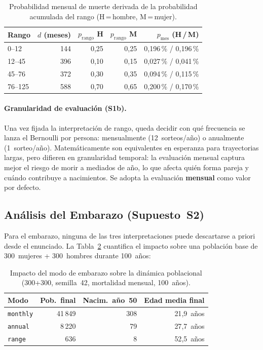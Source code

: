 \documentclass{llncs}
\begin{document}
\begin{table}[H]
\caption{Probabilidad mensual de muerte derivada de la probabilidad
         acumulada del rango (H\,=\,hombre, M\,=\,mujer).}
\label{tab:death_monthly}
\centering
\begin{tabular}{lrrrr}
\toprule
\textbf{Rango} & \textbf{$d$ (meses)} &
\textbf{$p_{\text{rango}}$ H} &
\textbf{$p_{\text{rango}}$ M} &
\textbf{$p_{\text{mes}}$ (H\,/\,M)} \\
\midrule
0--12   & 144 & 0{,}25 & 0{,}25 & 0{,}196\,\% / 0{,}196\,\% \\
12--45  & 396 & 0{,}10 & 0{,}15 & 0{,}027\,\% / 0{,}041\,\% \\
45--76  & 372 & 0{,}30 & 0{,}35 & 0{,}094\,\% / 0{,}115\,\% \\
76--125 & 588 & 0{,}70 & 0{,}65 & 0{,}200\,\% / 0{,}170\,\% \\
\bottomrule
\end{tabular}
\end{table}

\paragraph{Granularidad de evaluación (S1b).}
Una vez fijada la interpretación de rango, queda decidir con qué frecuencia
se lanza el Bernoulli por persona: mensualmente (12~sorteos/año) o
anualmente (1~sorteo/año).
Matemáticamente son equivalentes en esperanza para trayectorias largas,
pero difieren en granularidad temporal: la evaluación mensual captura mejor
el riesgo de morir a mediados de año, lo que afecta quién forma pareja y
cuándo contribuye a nacimientos.
Se adopta la evaluación \textbf{mensual} como valor por defecto.

\subsection{Análisis del Embarazo (Supuesto~S2)}

Para el embarazo, ninguna de las tres interpretaciones puede descartarse a
priori desde el enunciado.
La Tabla~\ref{tab:pregnancy_effects} cuantifica el impacto sobre una
población base de 300~mujeres + 300~hombres durante 100~años:

\begin{table}[H]
\caption{Impacto del modo de embarazo sobre la dinámica poblacional
         (300+300, semilla~42, mortalidad mensual, 100~años).}
\label{tab:pregnancy_effects}
\centering
\begin{tabular}{lrrr}
\toprule
\textbf{Modo} & \textbf{Pob.\ final} &
\textbf{Nacim.\ año~50} & \textbf{Edad media final} \\
\midrule
\texttt{monthly} & 41\,849 & 308 & 21{,}9~años \\
\texttt{annual}  &  8\,220 &  79 & 27{,}7~años \\
\texttt{range}   &    636  &   8 & 52{,}5~años \\
\bottomrule
\end{tabular}
\end{table}
\end{document}

